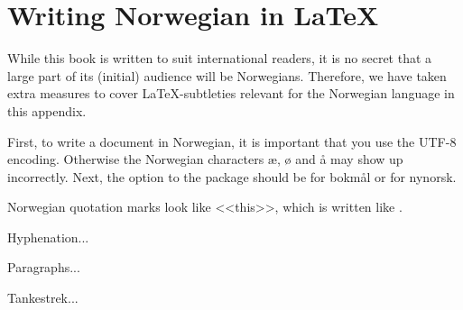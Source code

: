 \chapter{Writing Norwegian in \LaTeX{}}
While this book is written to suit international readers, it is no secret that a large part of its (initial) audience will be Norwegians. Therefore, we have taken extra measures to cover \LaTeX{}-subtleties relevant for the Norwegian language in this appendix.

First, to write a document in Norwegian, it is important that you use the UTF-8 encoding. Otherwise the Norwegian characters æ, ø and å may show up incorrectly. Next, the option to the  package should be  for bokmål or  for nynorsk.

Norwegian quotation marks look like <<this>>, which is written like .

Hyphenation...

Paragraphs...

Tankestrek...